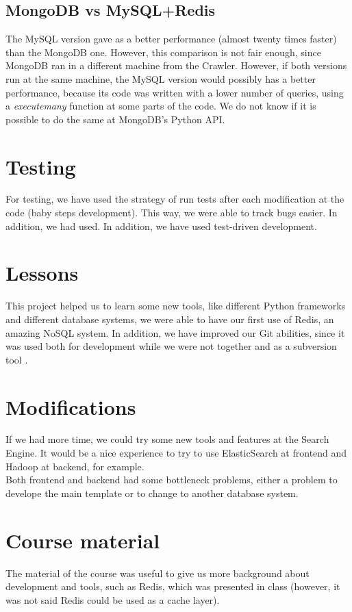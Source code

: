 \documentclass{article}
\begin{document}
\subsection{MongoDB vs MySQL+Redis}

The MySQL version gave as a better performance (almost twenty times faster) than the MongoDB one. However, this comparison is not fair enough, since MongoDB ran in a different machine from the Crawler. However, if both versions run at the same machine, the MySQL version would possibly has a better performance, because its code was written with a lower number of queries, using a \textit{executemany} function at some parts of the code. We do not know if it is possible to do the same at MongoDB's Python API.

\section{Testing}
For testing, we have used the strategy of run tests after each modification at the code (baby steps development). This way, we were able to track bugs easier. In addition, we had used. In addition, we have used test-driven development. 

\section{Lessons}
This project helped us to learn some new tools, like different Python frameworks and different database systems, we were able to have our first use of Redis, an amazing NoSQL system. In addition, we have improved our Git abilities, since it was used both for development while we were not together and as a subversion tool .

\section{Modifications}
If we had more time, we could try some new tools and features at the Search Engine. It would be a nice experience to try to use ElasticSearch at frontend and Hadoop at backend, for example. \\
Both frontend and backend had some bottleneck problems, either a problem to develope the main template or to change to another database system.

\section{Course material}
The material of the course was useful to give us more background about development and tools, such as Redis, which was presented in class (however, it was not said Redis could be used as a cache layer).
\end{document}
